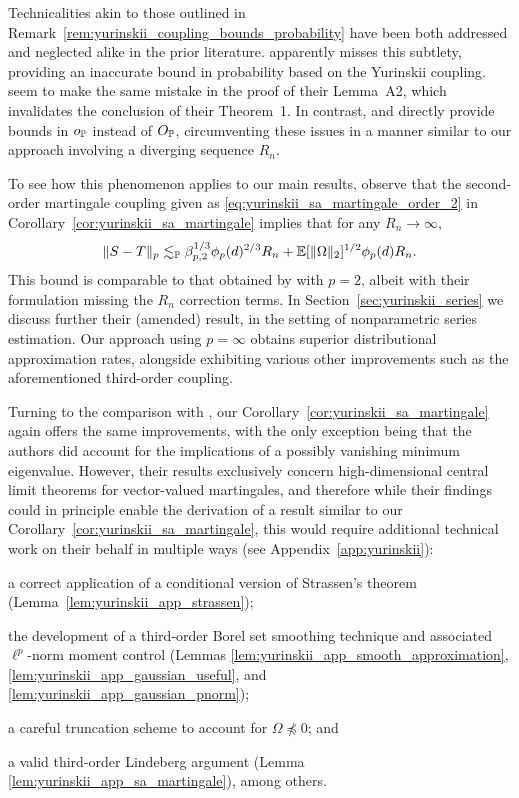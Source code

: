 Technicalities akin to those outlined in
Remark~\ref{rem:yurinskii_coupling_bounds_probability} have been both addressed
and
neglected alike in the prior literature. \citet[Chapter 10.4, Example
16]{pollard2002user} apparently misses this subtlety, providing an
inaccurate bound in probability based on the Yurinskii coupling.
\citet{li2020uniform} seem to make the same mistake in the proof of their
Lemma~A2, which invalidates the conclusion of their Theorem~1. In contrast,
\citet{belloni2015some} and \citet{belloni2019conditional} directly provide
bounds in $o_\P$ instead of $O_\P$, circumventing these issues in a manner
similar to our approach involving a diverging sequence $R_n$.

To see how this phenomenon applies to our main results, observe that the
second-order martingale coupling given as
\eqref{eq:yurinskii_sa_martingale_order_2} in
Corollary~\ref{cor:yurinskii_sa_martingale} implies that for any
$R_n \to \infty$,
%
\begin{align*}
  \|S - T\|_p
  \lesssim_\P
  \beta_{p,2}^{1/3}
  \phi_p(d)^{2/3} R_n
  + \E[\|\Omega\|_2]^{1/2}
  \phi_p(d) R_n.
\end{align*}
%
This bound is comparable to that obtained by \citet[Theorem~1]{li2020uniform}
with $p=2$, albeit with their formulation missing the $R_n$ correction terms.
In Section~\ref{sec:yurinskii_series} we discuss further their (amended)
result, in the
setting of nonparametric series estimation. Our approach using
$p = \infty$ obtains superior distributional approximation rates, alongside
exhibiting various other improvements such as the aforementioned third-order
coupling.

Turning to the comparison with \citet{belloni2018high}, our
Corollary~\ref{cor:yurinskii_sa_martingale} again offers the same improvements,
with the
only exception being that the authors did account for the implications of a
possibly vanishing minimum eigenvalue. However, their results exclusively
concern high-dimensional central limit theorems for vector-valued martingales,
and therefore while their findings
could in principle enable the derivation of a result similar to our
Corollary~\ref{cor:yurinskii_sa_martingale}, this would require additional
technical work
on their behalf in multiple ways
(see Appendix~\ref{app:yurinskii}):
%
\begin{inlineroman}
  \item a correct application of a conditional
    version of Strassen's theorem
    (Lemma~\ref{lem:yurinskii_app_strassen});
  \item the development of a third-order Borel set smoothing technique and
    associated $\ell^p$-norm moment control
    (Lemmas \ref{lem:yurinskii_app_smooth_approximation},
      \ref{lem:yurinskii_app_gaussian_useful},
    and \ref{lem:yurinskii_app_gaussian_pnorm});
  \item a careful truncation scheme to account for
    $\Omega\npreceq0$; and
  \item a valid third-order Lindeberg argument
    (Lemma \ref{lem:yurinskii_app_sa_martingale}),
    among others.
\end{inlineroman}

